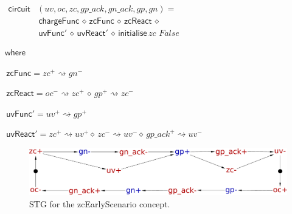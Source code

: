 \documentclass[british,compsoc]{IEEEtran}
\begin{document}
\begin{onehalfspace}
\begin{minipage}[t]{1\columnwidth}%

\begin{flushleft}
$\begin{aligned}\mathsf{circuit}&(uv, oc, zc, gp\_ack, gn\_ack, gp, gn)= \\ &\,\mathsf{chargeFunc}\,\diamond\,\mathsf{zcFunc}\,\diamond\,\mathsf{zcReact}\,\diamond\\
& \,\mathsf{uvFunc'}\,\diamond\,\mathsf{uvReact'}\,\diamond\,\mathsf{initialise}\,zc\,\,False
\end{aligned}
$
\par\end{flushleft}%

\begin{flushleft}
$\mathsf{where}$
\end{flushleft}

\begin{flushleft}
$\,\mathsf{zcFunc}=zc^{+}\rightsquigarrow gn^{-}$
\par\end{flushleft}

\begin{flushleft}
$\,\mathsf{zcReact}=oc^{-}\rightsquigarrow zc^{+}\,\diamond\, gp^{+}\rightsquigarrow zc^{-}$
\par\end{flushleft}

\begin{flushleft}
$\,\mathsf{uvFunc'}=uv^{+}\rightsquigarrow gp^{+}$
\par\end{flushleft}

\begin{flushleft}
$\,\mathsf{uvReact'}=zc^{+}\rightsquigarrow uv^{+}\diamond\, zc^{-}\rightsquigarrow uv^{-}\diamond\, gp\_ack^{+}\rightsquigarrow uv^{-}$
\par\end{flushleft}

\end{minipage}
\end{onehalfspace}

\begin{center}
\begin{figure}[H]
\begin{centering}
\includegraphics[scale=0.22]{Images/stg-UV_after_ZC}
\par\end{centering}

\protect\caption{\label{fig:zcEarlyScenario STG}STG for the \textsf{zcEarlyScenario}
concept.}
\end{figure}

\par\end{center}
\end{document}
